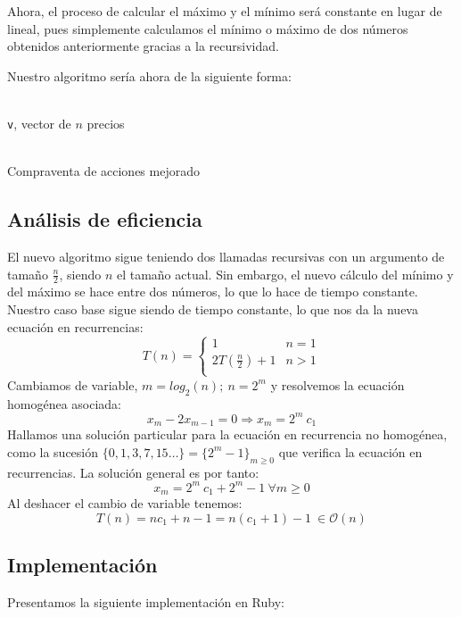 \documentclass[a4paper, 11pt]{article} %
\begin{document}
	Ahora, el proceso de calcular el máximo y el mínimo será constante en lugar de lineal, pues simplemente calculamos el mínimo o máximo de dos números obtenidos anteriormente gracias a la recursividad. 
	
	Nuestro algoritmo sería ahora de la siguiente forma: 
	
	\begin{algorithm}[H]
		\begin{algorithmic}[1]
			\REQUIRE \ \\
				\texttt{v}, vector de $n$ precios\\\
			\ELSE
				\STATE{\texttt{(min,max)$\leftarrow \bigg(\min(min_L, min_R),\max(max_L, max_R)\bigg)$}}
			\ENDIF
			\end{algorithmic}
		\caption{Compraventa de acciones mejorado}
		\label{algoritmo mejorado}
	\end{algorithm}
	
\subsection{Análisis de eficiencia}
El nuevo algoritmo sigue teniendo dos llamadas recursivas con un argumento de tamaño $\frac{n}{2}$, siendo $n$ el tamaño actual. Sin embargo, el nuevo cálculo 
del mínimo y del máximo se hace entre dos números, lo que lo hace de tiempo constante. Nuestro caso base sigue siendo de tiempo constante, lo que nos da la nueva 
ecuación en recurrencias: 
\begin{equation}
T(n)=\left\lbrace
	    \begin{array}{lr}
            1 & n = 1\\
            2T\left(\frac{n}{2}\right) + 1 & n>1\\
            \end{array}
	    \right.
\end{equation}
Cambiamos de variable, $m = log_2(n);\ n = 2^m$ y resolvemos la ecuación homogénea asociada: 
$$ x_m-2x_{m-1}=0 \Rightarrow x_m = 2^m\ c_1 $$
Hallamos una solución particular para la ecuación en recurrencia no homogénea, como la sucesión $\{0, 1, 3, 7, 15\dots\}=\{2^{m}-1\}_{m\ge 0}$ que verifica la ecuación en recurrencias. La solución general es por tanto:
$$ x_m = 2^m\ c_1 + 2^{m}-1\ \forall m\ge 0$$
Al deshacer el cambio de variable tenemos:
$$ T(n) = nc_1 + n-1 = n(c_1 + 1)-1\ \in \mathcal{O}(n)$$
	
	
\subsection{Implementación}
Presentamos la siguiente implementación en Ruby: \\
  \small
    \texttt{}
  \normalsize
	
	
\end{document}
